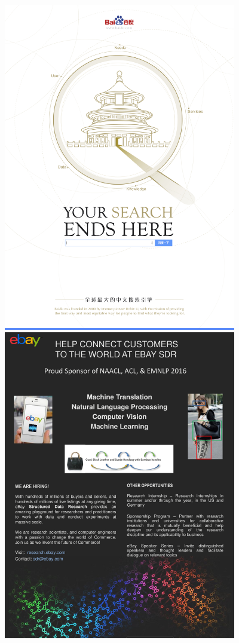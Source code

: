 \clearpage

\thispagestyle{empty}
\includegraphics[width=4in]{content/ads/ads/baidu_full_page} \\

\thispagestyle{empty}
\includegraphics[width=4in]{content/ads/ads/ebay_half_page} \\

